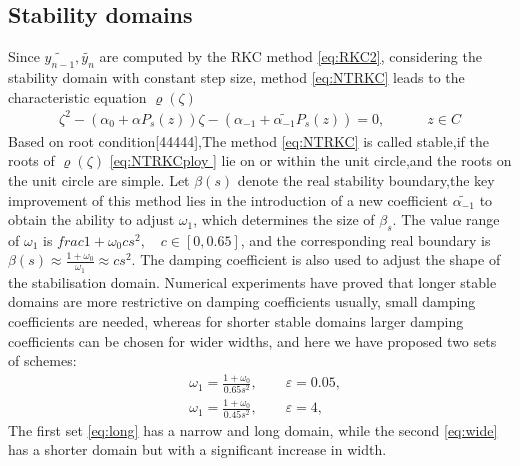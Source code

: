 \documentclass[review,fleqn]{elsarticle}
\begin{document}
\subsection{Stability domains}
Since $\tilde{y_{n-1}},\tilde{y_n}$ are computed by the RKC method \eqref{eq:RKC2}, considering the stability domain with  constant step size, method \eqref{eq:NTRKC} leads to the characteristic equation $\varrho(\zeta)$
\begin{align}
    \zeta^2-(\alpha_0+\alpha P_s(z))\zeta-(\alpha_{-1}+\tilde{\alpha_{-1}}P_s(z))=0,\quad\quad\quad z\in C     
    \label{eq:NTRKCploy}
\end{align}
Based on root condition[44444],The method \eqref{eq:NTRKC} is called stable,if the roots of $\varrho(\zeta)$ \eqref{eq:NTRKCploy } lie on or within the unit circle,and the roots on the unit circle are simple.
Let $\beta(s)$ denote the real stability boundary,the key improvement of this method lies in the introduction of a new coefficient $\tilde{\alpha_{-1}}$ to obtain the ability to adjust $\omega_1$, which determines the size of $\beta_{s}$.
 The value range of $\omega_1$ is $frac{1+\omega_0}{cs^2},\quad c \in [0,0.65]$, and the corresponding real boundary is $\beta(s)\approx\frac{1+\omega _0}{\omega_1}\approx cs^2 $. The damping coefficient is also used to adjust the shape of the stabilisation domain. 
 Numerical experiments have proved that longer stable domains are more restrictive on damping coefficients usually, 
 small damping coefficients are needed, whereas for shorter stable domains larger damping coefficients can be chosen for wider widths, and here we have proposed two sets of schemes:
\begin{align}
    &\omega_1=\frac{1+\omega_0}{0.65 s^2},\quad \quad \varepsilon=0.05,\label{eq:long}\\
    &\omega_1=\frac{1+\omega_0}{0.45 s^2},\quad \quad \varepsilon=4,
    \label{eq:wide}
\end{align}
The first set \eqref{eq:long} has a narrow and long domain, while the second \eqref{eq:wide} has a shorter domain but with a significant increase in width.
\end{document}
